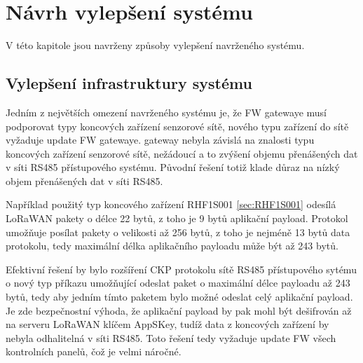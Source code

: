 \chapter{Návrh vylepšení systému}
V této kapitole jsou navrženy způsoby vylepšení navrženého systému.


\section{Vylepšení infrastruktury systému}
Jedním z největších omezení navrženého systému je, že FW gatewaye musí podporovat typy \DIFdelbegin {}\DIFdelend koncových zařízení senzorové sítě, \DIFdelbegin {}\DIFdelend \DIFaddbegin {}\DIFaddend nového typu zařízení do sítě vyžaduje update FW gatewaye.
\DIFdelbegin {}\DIFdelend \DIFaddbegin {}\DIFaddend gateway nebyla závislá na znalosti typu koncových zařízení senzorové sítě, \DIFdelbegin {}\DIFdelend \DIFaddbegin {}\DIFaddend nežádoucí \DIFdelbegin {}\DIFdelend \DIFaddbegin {}\DIFaddend a to zvýšení objemu přenášených dat v síti RS485 přístupového systému.
Původní \DIFaddbegin {}\DIFaddend řešení \DIFaddbegin {}\DIFaddend totiž klade důraz na nízký objem přenášených dat v síti RS485.

Například použitý typ koncového zařízení RHF1S001 \ref{sec:RHF1S001} odesílá LoRaWAN pakety o délce 22 bytů, z toho je 9 bytů aplikační payload. Protokol umožňuje posílat pakety o velikosti až 256 bytů, z toho je nejméně 13 bytů data protokolu, tedy maximální délka aplikačního payloadu může být až 243 bytů.

Efektivní řešení by bylo rozšíření CKP protokolu sítě RS485 přístupového sytému o nový typ příkazu umožňující odeslat paket o maximální délce payloadu až 243 bytů, tedy aby jedním tímto paketem bylo možné odeslat celý aplikační payload. 
Je zde bezpečnostní výhoda, že aplikační payload by pak mohl být dešifrován až na serveru LoRaWAN klíčem AppSKey, tudíž \DIFdelbegin {}\DIFdelend data z koncových zařízení by nebyla odhalitelná v síti RS485.
Toto řešení tedy vyžaduje update FW všech kontrolních panelů, čož je velmi náročné.

